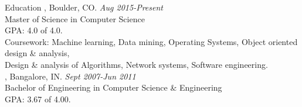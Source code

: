 
\begin{category}{Education}
, Boulder, CO. \hfill \textit{Aug 2015-Present}
\\ \hfill Master of Science in Computer Science\\
GPA: 4.0 of 4.0.\\
Coursework: Machine learning, Data mining, Operating Systems, Object oriented design \& analysis,\\ Design \& analysis of Algorithms, Network systems, Software engineering.\\
, Bangalore, IN. \hfill \textit{Sept 2007-Jun 2011}
\\ \hfill Bachelor of Engineering in Computer Science \& Engineering\\
GPA: 3.67 of 4.00.
\end{category}
